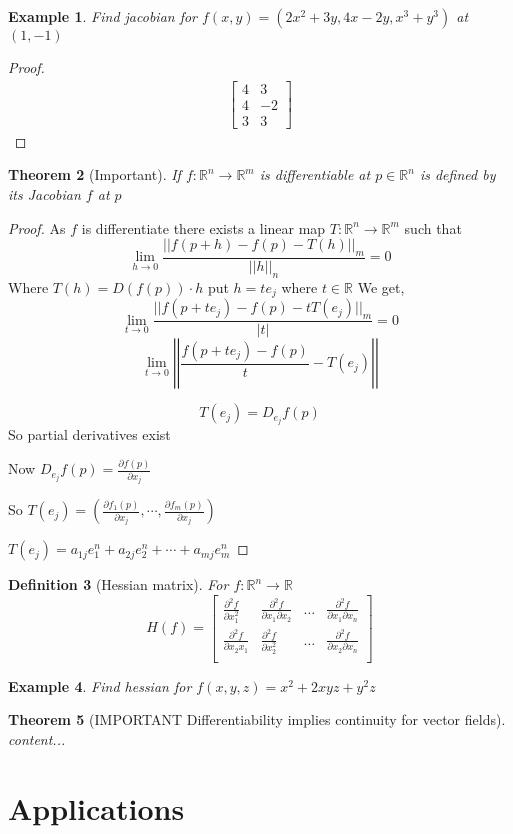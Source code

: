 \documentclass[oneside,11pt,pdftex]{book}%
\numberwithin{equation}{section}
\newtheorem{theorem}{Theorem}[chapter]%
\newtheorem{example}[theorem]{Example}
\newtheorem{definition}[theorem]{Definition}
\numberwithin{section}{chapter}
\numberwithin{equation}{chapter}
\newcommand{\R}{\mathbb{R}}
\begin{document}
\begin{example}
	Find jacobian for $ f(x,y)=(2x^2+3y,4x-2y,x^3+y^3) $ at $ (1,-1) $
\end{example}
\begin{proof}
	\begin{align*}
		\begin{bmatrix}
			4 & 3\\
			4 & -2\\
			3 & 3
		\end{bmatrix}
	\end{align*}
\end{proof}
\begin{theorem}[Important]
	If $ f:\R^n \to \R^m $ is differentiable at $ p \in \R^n $ is defined by its Jacobian $ f $ at $ p $
\end{theorem}
\begin{proof}
	As $ f $ is differentiate there exists a linear map $ T:\R^n \to \R^m $ such that
	\[ \lim_{h\to 0} \frac{||f(p+h)-f(p)-T(h)||_m}{||h||_n} =0\]
	Where $ T(h) =D(f(p))\cdot h$
	put $ h=t e_j $ where $ t\in \R  $
	We get,
	\[ \lim_{t \to 0} \frac{||f(p+te_j)-f(p)-tT(e_j)||_m}{|t|} =0\]
	\[ \lim_{t \to 0} \left|\left|\frac{f(p+te_j)-f(p)}{t}-T(e_j)\right|\right| \]
	
	\[ T(e_j) =D_{e_j}f(p)\]
	So partial derivatives exist
	
	Now $ D_{e_j} f(p)=\frac{\partial f(p)}{\partial x_j}$
	
	So $ T(e_j) =\left(\frac{\partial f_1 (p)}{\partial x_j}, \cdots , \frac{\partial f_m(p)}{\partial x_j}\right)$
	
	$ T(e_j) =a_{1j}e_1^n+a_{2j}e_2^n+\cdots+a_{mj}e_m^n$
\end{proof}

\begin{definition}[Hessian matrix]
	For $ f:\R^n \to \R  $
	\[ H(f) = \begin{bmatrix}
		\frac{\partial ^2f}{\partial x_1^2} & \frac{\partial^2 f}{\partial x_1 \partial x_2} & \dots & \frac{\partial^2 f}{\partial x_1\partial x_n}\\
		\frac{\partial ^2f}{\partial x_2x_1} & \frac{\partial^2 f}{\partial x_2^2} & \dots & \frac{\partial^2 f}{\partial x_2\partial x_n}\\
	\end{bmatrix}\]
\end{definition}

\begin{example}
	Find hessian for $ f(x,y,z) =x^2+2xyz+y^2z$
\end{example}

\begin{theorem}[IMPORTANT Differentiability implies continuity for vector fields]
	content...
\end{theorem}

\chapter{Applications}
\backmatter
\end{document}
